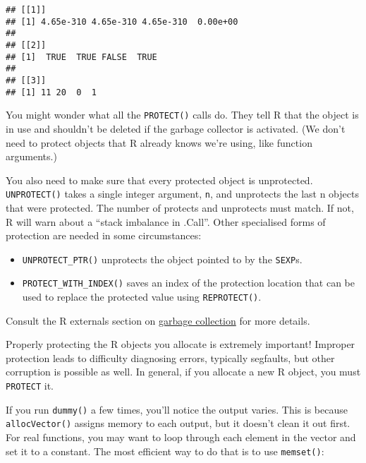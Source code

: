 \begin{verbatim}
## [[1]]
## [1] 4.65e-310 4.65e-310 4.65e-310  0.00e+00
## 
## [[2]]
## [1]  TRUE  TRUE FALSE  TRUE
## 
## [[3]]
## [1] 11 20  0  1
\end{verbatim}

You might wonder what all the \texttt{PROTECT()} calls do. They tell R
that the object is in use and shouldn't be deleted if the garbage
collector is activated. (We don't need to protect objects that R already
knows we're using, like function arguments.)

You also need to make sure that every protected object is unprotected.
\texttt{UNPROTECT()} takes a single integer argument, \texttt{n}, and
unprotects the last n objects that were protected. The number of
protects and unprotects must match. If not, R will warn about a ``stack
imbalance in .Call''. Other specialised forms of protection are needed
in some circumstances:

\begin{itemize}
\item
  \texttt{UNPROTECT\_PTR()} unprotects the object pointed to by the
  \texttt{SEXP}s.
\item
  \texttt{PROTECT\_WITH\_INDEX()} saves an index of the protection
  location that can be used to replace the protected value using
  \texttt{REPROTECT()}.
\end{itemize}

Consult the R externals section on
\href{http://cran.r-project.org/doc/manuals/R-exts.html\#Garbage-Collection}{garbage
collection} for more details.

Properly protecting the R objects you allocate is extremely important!
Improper protection leads to difficulty diagnosing errors, typically
segfaults, but other corruption is possible as well. In general, if you
allocate a new R object, you must \texttt{PROTECT} it.

If you run \texttt{dummy()} a few times, you'll notice the output
varies. This is because \texttt{allocVector()} assigns memory to each
output, but it doesn't clean it out first. For real functions, you may
want to loop through each element in the vector and set it to a
constant. The most efficient way to do that is to use \texttt{memset()}:

\begin{Shaded}
\begin{Highlighting}[]
\StringTok{ }\NormalTok{(}\NormalTok{(} \NormalTok{), }


\NormalTok{)}
\NormalTok{(}\NormalTok{);}
\end{Highlighting}
\end{Shaded}

